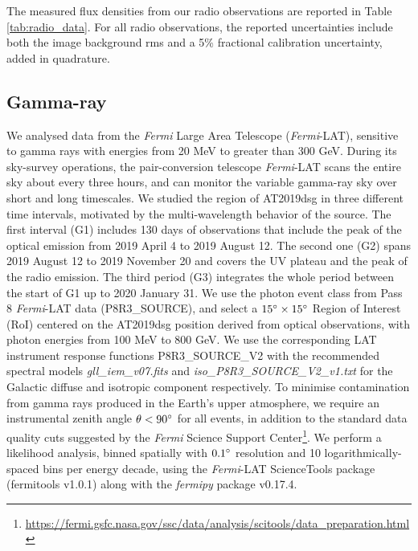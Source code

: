 The measured flux densities from our radio observations are reported in Table \ref{tab:radio_data}. For all radio observations, the reported uncertainties include both the image background rms and a 5\% fractional calibration uncertainty, added in quadrature.

\subsection{Gamma-ray}

We analysed data from the %
\textit{Fermi} Large Area Telescope (\textit{Fermi}-LAT)\cite{2009ApJ...697.1071A}, sensitive to gamma rays with energies from 20 MeV to greater than 300 GeV. During its sky-survey operations, the pair-conversion telescope \textit{Fermi}-LAT scans the entire sky about every three hours, and can monitor the variable gamma-ray sky over short and long timescales. We studied the region of AT2019dsg in three different time intervals, motivated by the multi-wavelength behavior of the source. The first interval (G1) includes 130 days of observations that include the peak of the optical emission from 2019 April 4 to 2019 August 12. The second one (G2) spans 2019 August 12 to 2019 November 20 and covers the UV plateau and the peak of the radio emission. The third period (G3) integrates the whole period between the start of G1 up to 2020 January 31. We use the photon event class from Pass 8 \textit{Fermi}-LAT data (P8R3\_SOURCE), and select a $15\mbox{$^\circ$} \times 15\mbox{$^\circ$}$ Region of Interest (RoI) centered on the AT2019dsg position derived from optical observations, with photon energies from 100 MeV to 800 GeV. We use the corresponding LAT instrument response functions P8R3\_SOURCE\_V2 with the recommended spectral models \textit{gll\_iem\_v07.fits} and \textit{iso\_P8R3\_SOURCE\_V2\_v1.txt} for the Galactic diffuse and isotropic component respectively. To minimise contamination from gamma rays produced in the Earth's upper atmosphere, we require an instrumental zenith angle $\theta<90\mbox{$^\circ$}$ for all events, in addition to the standard data quality cuts suggested by the \textit{Fermi} Science Support Center\footnote{\url{https://fermi.gsfc.nasa.gov/ssc/data/analysis/scitools/data_preparation.html}}. We perform a likelihood analysis, binned spatially with $0.1 \mbox{$^\circ$}$ resolution and 10 logarithmically-spaced bins per energy decade, using the \textit{Fermi}-LAT ScienceTools package (fermitools v1.0.1) along with the \textit{fermipy} package v0.17.4\cite{2017ICRC...35..824W}.

